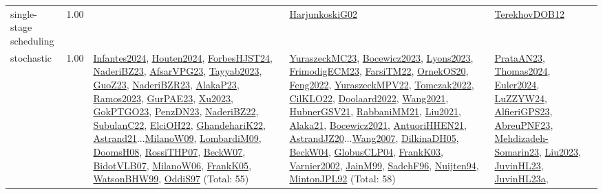 {\begin{longtable}{p{3cm}r>{\raggedright\arraybackslash}p{6cm}>{\raggedright\arraybackslash}p{6cm}>{\raggedright\arraybackslash}p{8cm}}
\index{single-stage scheduling}\index{Concepts!single-stage scheduling}single-stage scheduling &  1.00 &  & \hyperref[detail:HarjunkoskiG02]{HarjunkoskiG02} & \hyperref[detail:TerekhovDOB12]{TerekhovDOB12}\\
\index{stochastic}\index{Concepts!stochastic}stochastic &  1.00 & \hyperref[detail:Infantes2024]{Infantes2024}, \hyperref[detail:Houten2024]{Houten2024}, \hyperref[detail:ForbesHJST24]{ForbesHJST24}, \hyperref[detail:NaderiBZ23]{NaderiBZ23}, \hyperref[detail:AfsarVPG23]{AfsarVPG23}, \hyperref[detail:Tayyab2023]{Tayyab2023}, \hyperref[detail:GuoZ23]{GuoZ23}, \hyperref[detail:NaderiBZR23]{NaderiBZR23}, \hyperref[detail:AlakaP23]{AlakaP23}, \hyperref[detail:Ramos2023]{Ramos2023}, \hyperref[detail:GurPAE23]{GurPAE23}, \hyperref[detail:Xu2023]{Xu2023}, \hyperref[detail:GokPTGO23]{GokPTGO23}, \hyperref[detail:PenzDN23]{PenzDN23}, \hyperref[detail:NaderiBZ22]{NaderiBZ22}, \hyperref[detail:SubulanC22]{SubulanC22}, \hyperref[detail:ElciOH22]{ElciOH22}, \hyperref[detail:GhandehariK22]{GhandehariK22}, \hyperref[detail:Astrand21]{Astrand21}...\hyperref[detail:MilanoW09]{MilanoW09}, \hyperref[detail:LombardiM09]{LombardiM09}, \hyperref[detail:DoomsH08]{DoomsH08}, \hyperref[detail:RossiTHP07]{RossiTHP07}, \hyperref[detail:BeckW07]{BeckW07}, \hyperref[detail:BidotVLB07]{BidotVLB07}, \hyperref[detail:MilanoW06]{MilanoW06}, \hyperref[detail:FrankK05]{FrankK05}, \hyperref[detail:WatsonBHW99]{WatsonBHW99}, \hyperref[detail:OddiS97]{OddiS97} (Total: 55) & \hyperref[detail:YuraszeckMC23]{YuraszeckMC23}, \hyperref[detail:Bocewicz2023]{Bocewicz2023}, \hyperref[detail:Lyons2023]{Lyons2023}, \hyperref[detail:FrimodigECM23]{FrimodigECM23}, \hyperref[detail:FarsiTM22]{FarsiTM22}, \hyperref[detail:OrnekOS20]{OrnekOS20}, \hyperref[detail:Feng2022]{Feng2022}, \hyperref[detail:YuraszeckMPV22]{YuraszeckMPV22}, \hyperref[detail:Tomczak2022]{Tomczak2022}, \hyperref[detail:CilKLO22]{CilKLO22}, \hyperref[detail:Doolaard2022]{Doolaard2022}, \hyperref[detail:Wang2021]{Wang2021}, \hyperref[detail:HubnerGSV21]{HubnerGSV21}, \hyperref[detail:RabbaniMM21]{RabbaniMM21}, \hyperref[detail:Liu2021]{Liu2021}, \hyperref[detail:Alaka21]{Alaka21}, \hyperref[detail:Bocewicz2021]{Bocewicz2021}, \hyperref[detail:AntuoriHHEN21]{AntuoriHHEN21}, \hyperref[detail:AstrandJZ20]{AstrandJZ20}...\hyperref[detail:Wang2007]{Wang2007}, \hyperref[detail:DilkinaDH05]{DilkinaDH05}, \hyperref[detail:BeckW04]{BeckW04}, \hyperref[detail:GlobusCLP04]{GlobusCLP04}, \hyperref[detail:FrankK03]{FrankK03}, \hyperref[detail:Varnier2002]{Varnier2002}, \hyperref[detail:JainM99]{JainM99}, \hyperref[detail:SadehF96]{SadehF96}, \hyperref[detail:Nuijten94]{Nuijten94}, \hyperref[detail:MintonJPL92]{MintonJPL92} (Total: 58) & \hyperref[detail:PrataAN23]{PrataAN23}, \hyperref[detail:Thomas2024]{Thomas2024}, \hyperref[detail:Euler2024]{Euler2024}, \hyperref[detail:LuZZYW24]{LuZZYW24}, \hyperref[detail:AlfieriGPS23]{AlfieriGPS23}, \hyperref[detail:AbreuPNF23]{AbreuPNF23}, \hyperref[detail:Mehdizadeh-Somarin23]{Mehdizadeh-Somarin23}, \hyperref[detail:Liu2023]{Liu2023}, \hyperref[detail:JuvinHL23]{JuvinHL23}, \hyperref[detail:JuvinHL23a]{JuvinHL23a}, 
\end{longtable}}
